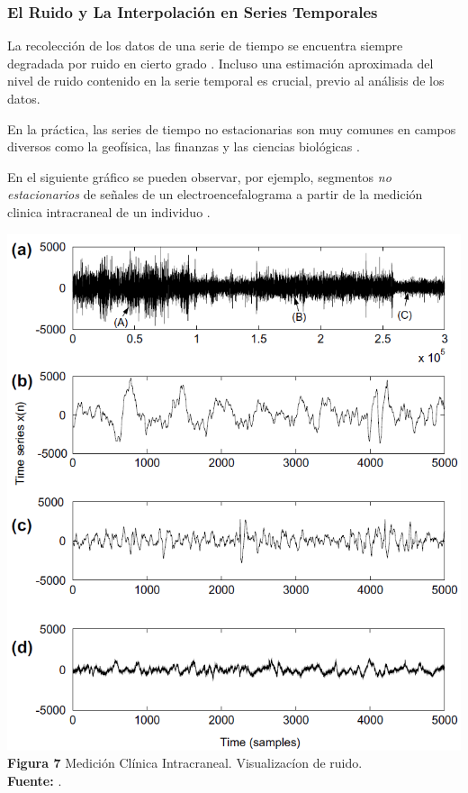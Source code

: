 \subsubsection{El Ruido y La Interpolaci\'on en Series Temporales}
La recolecci\'on de los datos de una serie de tiempo se encuentra siempre degradada por ruido en cierto grado \cite{noise}. Incluso una estimaci\'on aproximada del nivel de ruido contenido en la serie temporal es crucial, previo al an\'alisis de los datos.\par
En la pr\'actica, las series de tiempo no estacionarias son muy comunes en campos diversos como la geof\'isica, las finanzas y las ciencias biol\'ogicas \cite{concepts}.\par
En el siguiente gr\'afico se pueden observar, por ejemplo, segmentos \textit{no estacionarios} de se\~nales de un electroencefalograma a partir de la medici\'on clinica intracraneal de un individuo \cite{noise}.
\begin{center}
\includegraphics[scale=0.7]{brainsignal.png}\\
\vspace*{10pt}
\footnotesize{\textbf{Figura 7} Medici\'on Cl\'inica Intracraneal. Visualizac\'ion de ruido.}\\ \textbf{Fuente:} \cite{noise}.
\end{center}
